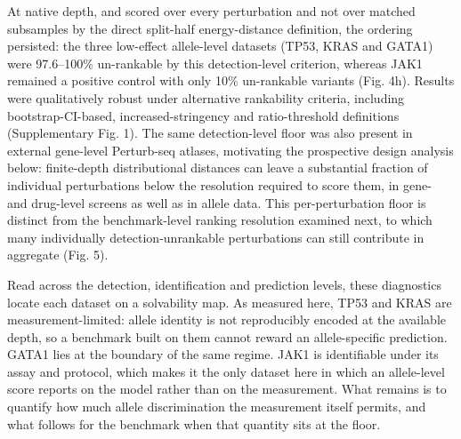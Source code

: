 \documentclass[11pt,letterpaper]{article}
\begin{document}
At native depth, and scored over every perturbation and not over matched subsamples by the direct split-half energy-distance definition, the ordering persisted: the three low-effect allele-level datasets (TP53, KRAS and GATA1) were 97.6--100\% un-rankable by this detection-level criterion, whereas JAK1 remained a positive control with only 10\% un-rankable variants (Fig. 4h). Results were qualitatively robust under alternative rankability criteria, including bootstrap-CI-based, increased-stringency and ratio-threshold definitions (Supplementary Fig. 1). The same detection-level floor was also present in external gene-level Perturb-seq atlases, motivating the prospective design analysis below: finite-depth distributional distances can leave a substantial fraction of individual perturbations below the resolution required to score them, in gene- and drug-level screens as well as in allele data. This per-perturbation floor is distinct from the benchmark-level ranking resolution examined next, to which many individually detection-unrankable perturbations can still contribute in aggregate (Fig. 5).

Read across the detection, identification and prediction levels, these diagnostics locate each dataset on a solvability map. As measured here, TP53 and KRAS are measurement-limited: allele identity is not reproducibly encoded at the available depth, so a benchmark built on them cannot reward an allele-specific prediction. GATA1 lies at the boundary of the same regime. JAK1 is identifiable under its assay and protocol, which makes it the only dataset here in which an allele-level score reports on the model rather than on the measurement. What remains is to quantify how much allele discrimination the measurement itself permits, and what follows for the benchmark when that quantity sits at the floor.
\end{document}
